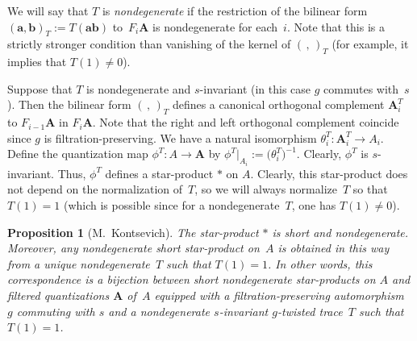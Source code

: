 \documentclass[11pt]{article}
\numberwithin{equation}{section}
\numberwithin{equation}{section}
\newtheorem{Proposition}[Theorem]{Proposition}
\begin{document}
We will say that $T$ is {\it nondegenerate} if the restriction of the bilinear form $({\mathbf a},{\mathbf b})_T:=T({\mathbf a}{\mathbf b})$ to~$F_i{{\mathbf A}}$ is nondegenerate for each~$i$. Note that this is a strictly stronger condition than vanishing of the kernel of $(\,,\,)_T$ (for example, it implies that $T(1)\ne 0$).

Suppose that $T$ is nondegenerate and $s$-invariant (in this case $g$ commutes with~$s$). Then the bilinear form $(\,,\,)_T$ defines a canonical orthogonal complement ${\mathbf A}^T_i$ to $F_{i-1}{{\mathbf A}}$ in $F_i{{\mathbf A}}$. Note that the right and left orthogonal complement coincide since $g$ is filtration-preserving. We have a natural isomorphism $\theta_i^T\colon {\mathbf A}_i^T\to A_i$. Define the quantization map $\phi^T\colon A\to {{\mathbf A}}$ by $\phi^T|_{A_i}:=\big(\theta_i^T\big)^{-1}$. Clearly, $\phi^T$ is $s$-invariant. Thus, $\phi^T$ defines a star-product $*$ on $A$. Clearly, this star-product does not depend on the normalization of~$T$, so we will always normalize~$T$ so that $T(1)=1$ (which is possible since for a nondegenerate~$T$, one has $T(1)\ne 0$).

\begin{Proposition}[M.~Kontsevich]\label{kon} The star-product $*$ is short and nondegenerate. Moreover, any nondegenerate short star-product on~$A$ is obtained in this way from a unique nondegenerate~$T$ such that $T(1)=1$. In other words, this correspondence is a bijection between short nondegenerate star-products on $A$ and filtered quantizations ${{\mathbf A}}$ of~$A$ equipped with a filtration-preserving automorphism~$g$ commuting with $s$ and a nondegenerate $s$-invariant $g$-twisted trace~$T$ such that $T(1)=1$.
\end{Proposition}
\end{document}
